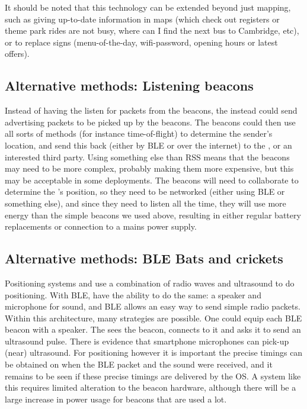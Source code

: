 It should be noted that this technology can be extended beyond just mapping, such as giving up-to-date information in maps (which check out registers or theme park rides are not busy, where can I find the next bus to Cambridge, etc), or to replace signs (menu-of-the-day, wifi-password, opening hours or latest offers). 


\subsection{Alternative methods: Listening beacons}
Instead of having the \device listen for packets from the beacons, the \device instead could send advertising packets to be picked up by the beacons.
The beacons could then use all sorts of methods (for instance time-of-flight) to determine the sender's location, and send this back (either by BLE or over the internet) to the \device, or an interested third party.
Using something else than RSS means that the beacons may need to be more complex, probably making them more expensive, but this may be acceptable in some deployments.
The beacons will need to collaborate to determine the \device's position, so they need to be networked (either using BLE or something else), and since they need to listen all the time, they will use more energy than the simple beacons we used above, resulting in either regular battery replacements or connection to a mains power supply.

\subsection{Alternative methods: BLE Bats and crickets}
Positioning systems \citep{harter2002anatomy} and \citep{priyantha2000cricket} use a combination of radio waves and ultrasound to do positioning.
With BLE, \device have the ability to do the same: a speaker and microphone for sound, and BLE allows \apps an easy way to send simple radio packets.
Within this architecture, many strategies are possible.
One could equip each BLE beacon with a speaker.
The \device sees the beacon, connects to it and asks it to send an ultrasound pulse.
There is evidence that smartphone microphones can pick-up (near) ultrasound\citep{arentz2011near,bihler2011smartguide}.
For positioning however it is important the precise timings can be obtained on when the BLE packet and the sound were received, and it remains to be seen if these precise timings are delivered by the OS.
A system like this requires limited alteration to the beacon hardware, although there will be a large increase in power usage for beacons that are used a lot.
